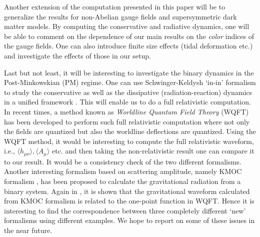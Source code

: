 Another extension of the computation presented in this paper will be to generalize the results for non-Abelian gauge fields and supersymmetric dark matter models. By computing the conservative and radiative dynamics, one will be able to comment on the dependence of our main results on the \textit{color} indices of the gauge fields. One can also introduce finite size effects (tidal deformation etc.)  and investigate the effects of those in our setup. \par 
Last but not least, it will be interesting to investigate the binary dynamics in the Post-Minkowskian (PM) regime. One can use Schwinger-Keldysh `in-in' formalism to study the conservative as well as the dissipative (radiation-reaction) dynamics in a unified framework \cite{Dlapa:2021npj,Kalin:2022hph,Dlapa:2022lmu,Dlapa:2021vgp,Dlapa:2023hsl}. This will enable us to do a full relativistic computation. In recent times, a method known as \textit{Worldline Quantum Field Theory} (WQFT) has been developed to perform such full relativistic computation \cite{Mogull:2020sak,Jakobsen:2022fcj,Jakobsen:2021zvh,Jakobsen:2021lvp,Jakobsen:2021smu,Jakobsen:2022psy} where not only the fields are quantized but also the worldline deflections are quantized. 
Using the WQFT method, it would be interesting to compute the full relativistic waveform, i.e., $\langle h_{\mu\nu}\rangle, \langle A_{\mu}\rangle$ etc. and then taking the non-relativistic result one can compare it to our result. It would be a consistency check of the two different formalisms. Another interesting formalism based on scattering amplitude, namely KMOC formalism \cite{Kosower:2018adc}, has been proposed to calculate the gravitational radiation from a binary system. Again in \cite{Mogull:2020sak}, it is shown that the gravitational waveform calculated from KMOC formalism is related to the one-point function in WQFT. Hence it is interesting to find the correspondence between three completely different `new' formalisms using different examples. We hope to report on some of these issues in the near future. 

